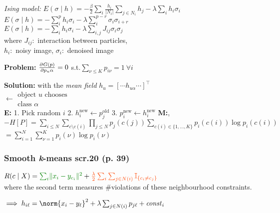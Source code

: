 \emph{Ising model:}\enskip
$E(\sigma\mid h) = -\frac{\beta}{2} \sum_i \frac{h_i}{|N_i|} \sum_{j \in N_i} h_j - \lambda \sum_i h_i \sigma_i$\\
$E(\sigma\mid h) = - \sum_i^p h_i \sigma_i  -\lambda\sum_i^{p-r}\sigma_i\sigma_{i+r} $\\
$E(\sigma\mid h) =  - \sum_i h_i \sigma_i - \lambda\sum_{i,j} J_{ij} \sigma_i \sigma_j$
\\
where $J_{ij}$:\, interaction between particles,\\\phantom{where}
$h_i$:\, noisy image,\enskip
$\sigma_i$:\, denoised image

\textbf{Problem:} \quad $\pderiv{G(p)}{p_u\alpha} = 0$ \enspace s.t.\enspace $\sum_{\nu\leq K} p_{i\nu} = 1 \: \forall i$

\textbf{Solution:}\quad
with the \textit{mean field} $h_u = [\cdots h_{u\alpha} \cdots]^\top$
\\
 $\leftarrow \substack{\text{object }u\text{ chooses}\\\text{class } \alpha}$
\\


\textbf{E:} 1. Pick random $i$ 2. $h_i^{\text{new}} \leftarrow p_j^{\text{old}}$ 3. $p_i^{\text{new}} \leftarrow h_i^{\text{new}}$
\textbf{M:},\\

$-H[P]=\underset{i\leq N}{\sum}\underset{c\setminus c(i)}{\sum}\underset{j\leq N}{\prod} p_j(c(j))\underset{{c(i)\in \{1,...,K\}}}{\sum}p_i(c(i))\log p_i(c(i))$\newline
$=\sum_{i=1}^{N}\sum_{\nu=1}^{K}p_i(\nu) \log p_i(\nu)$


\subsubsection{Smooth \textit{\rmfamily k}-means
\qquad\normalfont\sffamily\color{gray}scr.20 (p. 39)}

$R(c\mid X) =
{\color{Green} \sum_i \lVert x_i - y_{c_i} \rVert^2}
+
{\color{OrangeRed} \frac\lambda2 \sum_i \sum_{j\in N(i)} \mathbb I_{\{c_i \neq c_j\}}}$
\\
where the second term measures {\color{OrangeRed} \#violations} of these neighbourhood constraints.

$\implies h_{i\ell} = \norm{x_i - y_\ell}^2 + \lambda \sum_{j\in N(i)} p_{j\ell} + \mathit{const}_i$

